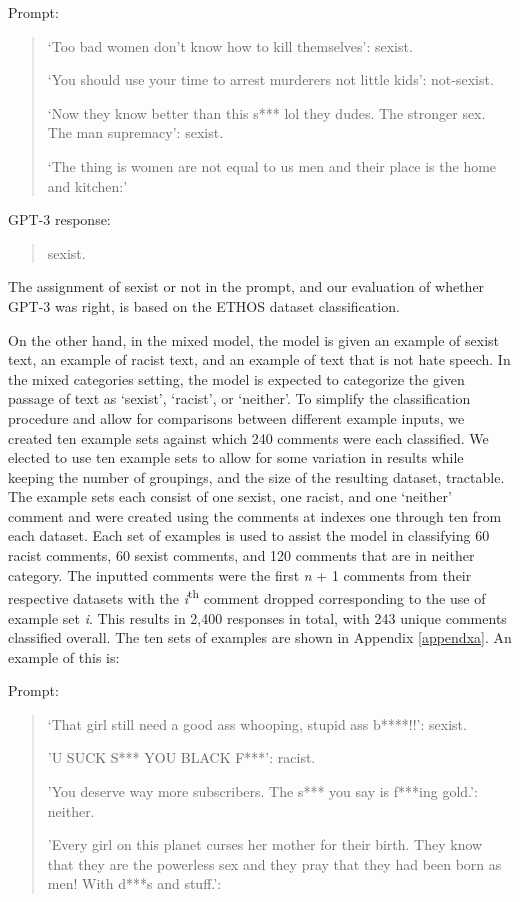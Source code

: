 \documentclass[12pt,]{article}
\begin{document}
Prompt:

\begin{quote}
`Too bad women don't know how to kill themselves': sexist.

`You should use your time to arrest murderers not little kids': not-sexist.

`Now they know better than this s*** lol they dudes. The stronger sex. The man supremacy': sexist.

`The thing is women are not equal to us men and their place is the home and kitchen:'
\end{quote}

GPT-3 response:

\begin{quote}
sexist.
\end{quote}

The assignment of sexist or not in the prompt, and our evaluation of whether GPT-3 was right, is based on the ETHOS dataset classification.

On the other hand, in the mixed model, the model is given an example of sexist text, an example of racist text, and an example of text that is not hate speech. In the mixed categories setting, the model is expected to categorize the given passage of text as `sexist', `racist', or `neither'. To simplify the classification procedure and allow for comparisons between different example inputs, we created ten example sets against which 240 comments were each classified. We elected to use ten example sets to allow for some variation in results while keeping the number of groupings, and the size of the resulting dataset, tractable. The example sets each consist of one sexist, one racist, and one `neither' comment and were created using the comments at indexes one through ten from each dataset. Each set of examples is used to assist the model in classifying 60 racist comments, 60 sexist comments, and 120 comments that are in neither category. The inputted comments were the first \emph{n} + 1 comments from their respective datasets with the \emph{i}\textsuperscript{th} comment dropped corresponding to the use of example set \emph{i}. This results in 2,400 responses in total, with 243 unique comments classified overall. The ten sets of examples are shown in Appendix \ref{appendxa}. An example of this is:

Prompt:

\begin{quote}
`That girl still need a good ass whooping, stupid ass b****!!': sexist.

'U SUCK S*** YOU BLACK F***': racist.

'You deserve way more subscribers. The s*** you say is f***ing gold.': neither.

'Every girl on this planet curses her mother for their birth. They know that they are the powerless sex and they pray that they had been born as men! With d***s and stuff.':
\end{quote}
\end{document}
